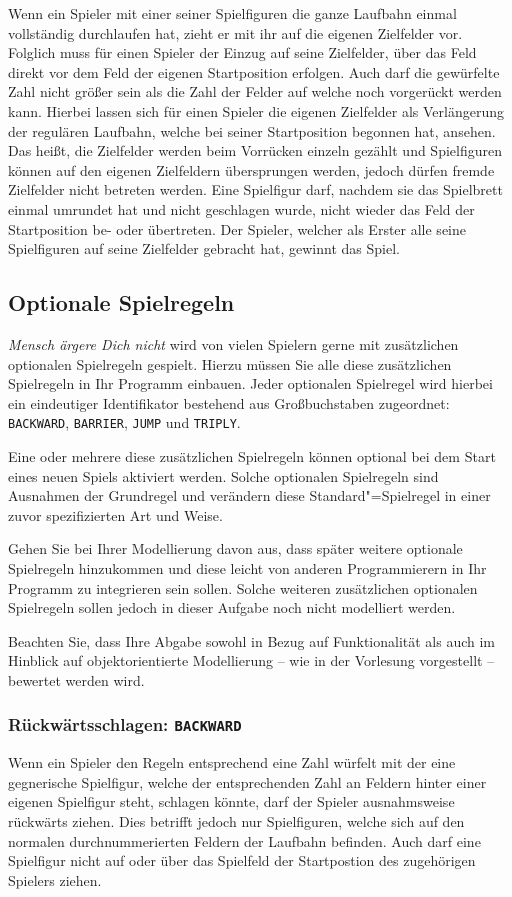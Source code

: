 Wenn ein Spieler mit einer seiner Spielfiguren die ganze Laufbahn einmal vollständig durchlaufen hat, zieht er mit ihr auf die eigenen Zielfelder vor. Folglich muss für einen Spieler der Einzug auf seine Zielfelder, über das Feld direkt vor dem Feld der eigenen Startposition erfolgen. Auch darf die gewürfelte Zahl nicht größer sein als die Zahl der Felder auf welche noch vorgerückt werden kann. Hierbei lassen sich für einen Spieler die eigenen Zielfelder als Verlängerung der regulären Laufbahn, welche bei seiner Startposition begonnen hat, ansehen. Das heißt, die Zielfelder werden beim Vorrücken einzeln gezählt und Spielfiguren können auf den eigenen Zielfeldern übersprungen werden, jedoch dürfen fremde Zielfelder nicht betreten werden. Eine Spielfigur darf, nachdem sie das Spielbrett einmal umrundet hat und nicht geschlagen wurde, nicht wieder das Feld der Startposition be- oder übertreten. Der Spieler, welcher als Erster alle seine Spielfiguren auf seine Zielfelder gebracht hat, gewinnt das Spiel. 

\subsection*{Optionale Spielregeln}
\emph{Mensch ärgere Dich nicht} wird von vielen Spielern gerne mit zusätzlichen optionalen Spielregeln gespielt. Hierzu müssen Sie alle diese zusätzlichen Spielregeln in Ihr Programm einbauen. Jeder optionalen Spielregel wird hierbei ein eindeutiger Identifikator bestehend aus Großbuchstaben zugeordnet: \texttt{BACKWARD}, \texttt{BARRIER}, \texttt{JUMP} und \texttt{TRIPLY}.

Eine oder mehrere diese zusätzlichen Spielregeln können optional bei dem Start eines neuen Spiels aktiviert werden. Solche optionalen Spielregeln sind Ausnahmen der Grundregel und verändern diese Standard"=Spielregel in einer zuvor spezifizierten Art und Weise. 

Gehen Sie bei Ihrer Modellierung davon aus, dass später weitere optionale Spielregeln hinzukommen und diese leicht von anderen Programmierern in Ihr Programm zu integrieren sein sollen. Solche weiteren zusätzlichen optionalen Spielregeln sollen jedoch in dieser Aufgabe noch nicht modelliert werden.

Beachten Sie, dass Ihre Abgabe sowohl in Bezug auf Funktionalität als auch im Hinblick auf objektorientierte Modellierung -- wie in der Vorlesung vorgestellt -- bewertet werden wird.

\subsubsection*{Rückwärtsschlagen: \texttt{BACKWARD}} 
Wenn ein Spieler den Regeln entsprechend eine Zahl würfelt mit der eine gegnerische Spielfigur, welche der entsprechenden Zahl an Feldern hinter einer eigenen Spielfigur steht, schlagen könnte, darf der Spieler ausnahmsweise rückwärts ziehen. Dies betrifft jedoch nur Spielfiguren, welche sich auf den normalen durchnummerierten Feldern der Laufbahn befinden. Auch darf eine Spielfigur nicht auf oder über das Spielfeld der Startpostion des zugehörigen Spielers ziehen.

